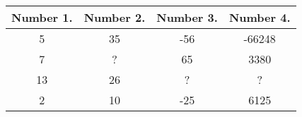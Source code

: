 \begin{table}[htbp]
\centering
\begin{tabular}{|c|c|c|c|}
\hline
\rowcolor[HTML]{67FD9A} 
\textbf{Number 1.} & \textbf{Number 2.} & \textbf{Number 3.} & \textbf{Number 4.} \\ \hline
5                  & 35                 & -56                & -66248             \\
7                  & ?                  & 65                 & 3380               \\
13                 & 26                 & ?                  & ?                  \\
2                  & 10                 & -25                & 6125               \\ \hline
\end{tabular}
\label{tab:logical_puzzle}
\end{table}